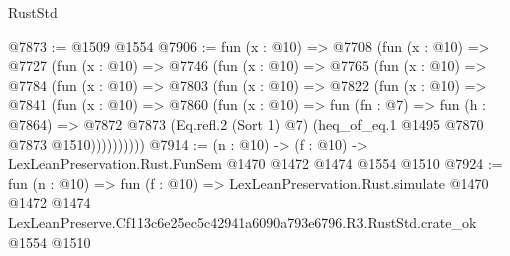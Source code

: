 \begin{lexlean}{RustStd}
\begin{coremodule}
@7873 := @1509 @1554
@7906 := fun (x : @10) =>
  @7708
    (fun (x : @10) =>
    @7727
      (fun (x : @10) =>
      @7746
        (fun (x : @10) =>
        @7765
          (fun (x : @10) =>
          @7784
            (fun (x : @10) =>
            @7803
              (fun (x : @10) =>
              @7822
                (fun (x : @10) =>
                @7841
                  (fun (x : @10) =>
                  @7860
                    (fun (x : @10) =>
                    fun (fn : @7) =>
                    fun (h : @7864) =>
                    @7872
                      @7873
                      (Eq.refl.{2} (Sort 1) @7)
                      (heq_of_eq.{1} @1495 @7870 @7873 @1510))))))))))
@7914 := (n : @10) -> (f : @10) -> LexLeanPreservation.Rust.FunSem @1470 @1472 @1474 @1554 @1510
@7924 := fun (n : @10) =>
  fun (f : @10) =>
  LexLeanPreservation.Rust.simulate
    @1470
    @1472
    @1474
    LexLeanPreserve.Cf113c6e25ec5c42941a6090a793e6796.R3.RustStd.crate_ok
    @1554
    @1510
\end{coremodule}
\end{lexlean}
